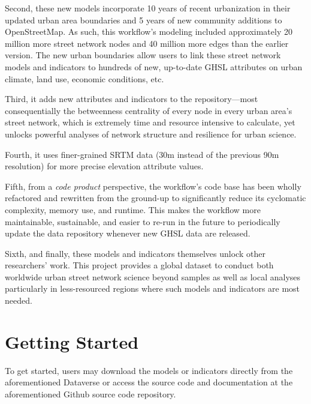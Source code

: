 \documentclass[12pt,letterpaper]{article} %
\begin{document}
Second, these new models incorporate 10 years of recent urbanization in their updated urban area boundaries and 5 years of new community additions to OpenStreetMap. As such, this workflow's modeling included approximately 20 million more street network nodes and 40 million more edges than the earlier version. The new urban boundaries allow users to link these street network models and indicators to hundreds of new, up-to-date GHSL attributes on urban climate, land use, economic conditions, etc.

Third, it adds new attributes and indicators to the repository---most consequentially the betweenness centrality of every node in every urban area's street network, which is extremely time and resource intensive to calculate, yet unlocks powerful analyses of network structure and resilience for urban science.

Fourth, it uses finer-grained SRTM data (30m instead of the previous 90m resolution) for more precise elevation attribute values.

Fifth, from a \textit{code product} perspective, the workflow's code base has been wholly refactored and rewritten from the ground-up to significantly reduce its cyclomatic complexity, memory use, and runtime. This makes the workflow more maintainable, sustainable, and easier to re-run in the future to periodically update the data repository whenever new GHSL data are released.

Sixth, and finally, these models and indicators themselves unlock other researchers' work. This project provides a global dataset to conduct both worldwide urban street network science beyond samples as well as local analyses particularly in less-resourced regions where such models and indicators are most needed.

\section{Getting Started}

To get started, users may download the models or indicators directly from the aforementioned Dataverse or access the source code and documentation at the aforementioned Github source code repository.


\setlength{\bibsep}{0.00cm plus 0.05cm} %


\end{document}
